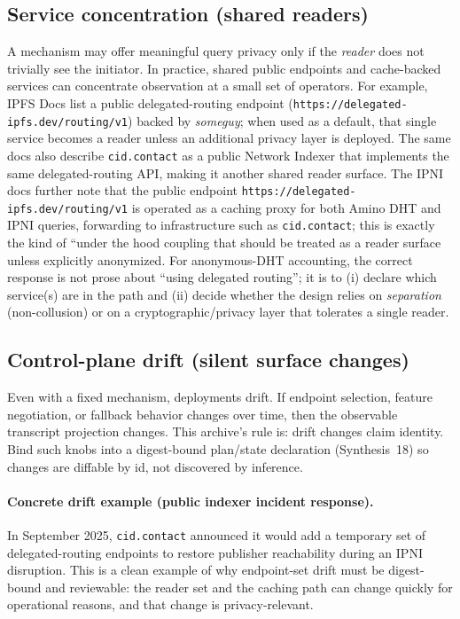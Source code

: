 \documentclass[11pt]{article}
\begin{document}
\subsection{Service concentration (shared readers)}
A mechanism may offer meaningful query privacy only if the \emph{reader} does not trivially see the initiator.
In practice, shared public endpoints and cache-backed services can concentrate observation at a small set of operators.
For example, IPFS Docs list a public delegated-routing endpoint (\texttt{https://delegated-ipfs.dev/routing/v1}) backed by \emph{someguy}; when used as a default, that single service becomes a reader unless an additional privacy layer is deployed.\cite{ipfsDocsPublicUtilities,ipfsSomeguy}
The same docs also describe \texttt{cid.contact} as a public Network Indexer that implements the same delegated-routing API, making it another shared reader surface.\cite{ipfsDocsNodes}
The IPNI docs further note that the public endpoint \texttt{https://delegated-ipfs.dev/routing/v1} is operated as a caching proxy for both Amino DHT and IPNI queries, forwarding to infrastructure such as \texttt{cid.contact}; this is exactly the kind of ``under the hood coupling that should be treated as a reader surface unless explicitly anonymized.\cite{ipfsDocsIPNI,ipfsSomeguy}
For anonymous-DHT accounting, the correct response is not prose about ``using delegated routing''; it is to (i) declare which service(s) are in the path and (ii) decide whether the design relies on \emph{separation} (non-collusion) or on a cryptographic/privacy layer that tolerates a single reader.

\subsection{Control-plane drift (silent surface changes)}
Even with a fixed mechanism, deployments drift.
If endpoint selection, feature negotiation, or fallback behavior changes over time, then the observable transcript projection changes.
This archive's rule is: drift changes claim identity.
Bind such knobs into a digest-bound plan/state declaration (Synthesis~18) so changes are diffable by id, not discovered by inference.
\cite{series:planstateequiv}

\paragraph{Concrete drift example (public indexer incident response).}
In September 2025, \texttt{cid.contact} announced it would add a temporary set of delegated-routing endpoints to restore publisher reachability during an IPNI disruption.
This is a clean example of why endpoint-set drift must be digest-bound and reviewable: the reader set and the caching path can change quickly for operational reasons, and that change is privacy-relevant.\cite{ipfsDiscussCidContactEndpoints2025}
\end{document}
